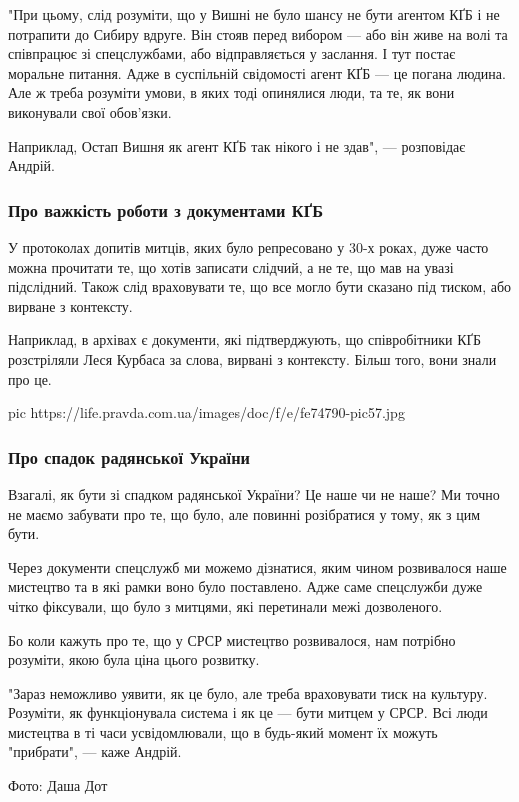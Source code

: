 "При цьому, слід розуміти, що у Вишні не було шансу не бути агентом КҐБ і не
потрапити до Сибиру вдруге. Він стояв перед вибором --- або він живе на волі та
співпрацює зі спецслужбами, або відправляється у заслання. І тут постає
моральне питання. Адже в суспільній свідомості агент КҐБ --- це погана людина.
Але ж треба розуміти умови, в яких тоді опинялися люди, та те, як вони
виконували свої обов'язки. 

Наприклад, Остап Вишня як агент КҐБ так нікого і не здав", --- розповідає Андрій.

\subsubsection{Про важкість роботи з документами КҐБ}

У протоколах допитів митців, яких було репресовано у 30-х роках, дуже часто
можна прочитати те, що хотів записати слідчий, а не те, що мав на увазі
підслідний. Також слід враховувати те, що все могло бути сказано під тиском,
або вирване з контексту.

Наприклад, в архівах є документи, які підтверджують, що співробітники КҐБ
розстріляли Леся Курбаса за слова, вирвані з контексту. Більш того, вони знали
про це.

\ifcmt
pic https://life.pravda.com.ua/images/doc/f/e/fe74790-pic57.jpg
\fi

\subsubsection{Про спадок радянської України}

Взагалі, як бути зі спадком радянської України? Це наше чи не наше? Ми точно не
маємо забувати про те, що було, але повинні розібратися у тому, як з цим бути.

Через документи спецслужб ми можемо дізнатися, яким чином розвивалося наше
мистецтво та в які рамки воно було поставлено. Адже саме спецслужби дуже чітко
фіксували, що було з митцями, які перетинали межі дозволеного.

Бо коли кажуть про те, що у СРСР мистецтво розвивалося, нам потрібно розуміти,
якою була ціна цього розвитку.

"Зараз неможливо уявити, як це було, але треба враховувати тиск на культуру.
Розуміти, як функціонувала система і як це --- бути митцем у СРСР. Всі люди
мистецтва в ті часи усвідомлювали, що в будь-який момент їх можуть "прибрати",
--- каже Андрій.

Фото: Даша Дот
